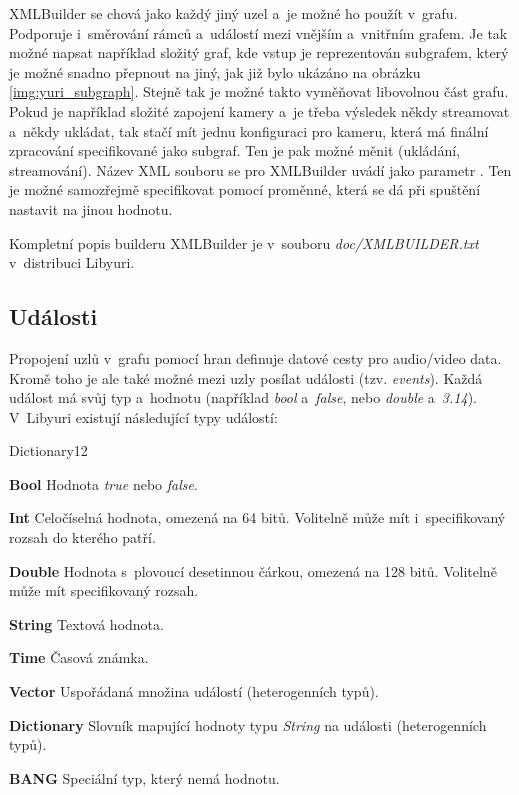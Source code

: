 \documentclass[thesis=M,czech]{FITthesis}[2012/06/26]
\begin{document}
XMLBuilder se chová jako každý jiný uzel a~je možné ho použít v~grafu. Podporuje i~směrování rámců a~událostí mezi vnějším a~vnitřním grafem. Je tak možné napsat například složitý graf, kde vstup je reprezentován subgrafem, který je možné snadno přepnout na jiný, jak již bylo ukázáno na obrázku \ref{img:yuri_subgraph}. Stejně tak je možné takto vyměňovat libovolnou část grafu. Pokud je například složité zapojení kamery a~je třeba výsledek někdy streamovat a~někdy ukládat, tak stačí mít jednu konfiguraci pro kameru, která má finální zpracování specifikované jako subgraf. Ten je pak možné měnit (ukládání, streamování). 
Název XML souboru se pro XMLBuilder uvádí jako parametr . Ten je možné samozřejmě specifikovat pomocí proměnné, která se dá při spuštění nastavit na jinou hodnotu. 

Kompletní popis builderu XMLBuilder je v~souboru \textit{doc/XMLBUILDER.txt} v~distribuci Libyuri.

\subsection{Události} \label{subsec:analyza_yuri_udalosti}
Propojení uzlů v~grafu pomocí hran definuje datové cesty pro audio/video data. Kromě toho je ale také možné mezi uzly posílat události (tzv. \textit{events}). Každá událost má svůj typ a~hodnotu (například \textit{bool} a~\textit{false}, nebo \textit{double} a~\textit{3.14}). V~Libyuri existují následující typy událostí:

\begin{labeling}{Dictionary12}
\item [\textbf{Bool}] Hodnota \textit{true} nebo \textit{false}.
\item [\textbf{Int}] Celočíselná hodnota, omezená na 64 bitů. Volitelně může mít i~specifikovaný rozsah do kterého patří.
\item [\textbf{Double}] Hodnota s~plovoucí desetinnou čárkou, omezená na 128 bitů. Volitelně může mít specifikovaný rozsah.
\item [\textbf{String}] Textová hodnota.
\item [\textbf{Time}] Časová známka.
\item [\textbf{Vector}] Uspořádaná množina událostí (heterogenních typů).
\item [\textbf{Dictionary}] Slovník mapující hodnoty typu \textit{String} na události (heterogenních typů).
\item [\textbf{BANG}] Speciální typ, který nemá hodnotu.
\end{labeling}
\end{document}
